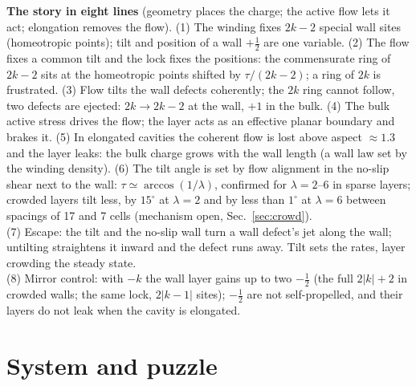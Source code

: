 \documentclass[11pt,a4paper]{article}
\newcommand{\half}{\tfrac12}
\newcommand{\keybox}[1]{\par\smallskip\noindent\colorbox{black!6}{\parbox{\dimexpr\linewidth-2\fboxsep}{\small #1}}\par\smallskip}
\begin{document}
\keybox{\textbf{The story in eight lines} (geometry places the charge; the active flow lets it act; elongation removes the flow).
(1) The winding fixes $2k-2$ special wall sites (homeotropic points); tilt and position of a wall $+\half$ are one variable.
(2) The flow fixes a common tilt and the lock fixes the positions: the commensurate ring of $2k-2$ sits at the homeotropic points shifted by $\tau/(2k-2)$; a ring of $2k$ is frustrated.
(3) Flow tilts the wall defects coherently; the $2k$ ring cannot follow, two defects are ejected: $2k\to2k-2$ at the wall, $+1$ in the bulk.
(4) The bulk active stress drives the flow; the layer acts as an effective planar boundary and brakes it.
(5) In elongated cavities the coherent flow is lost above aspect $\approx1.3$ and the layer leaks: the bulk charge grows with the wall length (a wall law set by the winding density).
(6) The tilt angle is set by flow alignment in the no-slip shear next to the wall: $\tau\simeq\arccos(1/\lambda)$, confirmed for $\lambda=2$--6 in sparse layers; crowded layers tilt less, by $15^\circ$ at $\lambda=2$ and by less than $1^\circ$ at $\lambda=6$ between spacings of 17 and 7 cells (mechanism open, Sec.~\ref{sec:crowd}).\\
(7) Escape: the tilt and the no-slip wall turn a wall defect's jet along the wall; untilting straightens it inward and the defect runs away. Tilt sets the rates, layer crowding the steady state.\\
(8) Mirror control: with $-k$ the wall layer gains up to two $-\half$ (the full $2|k|+2$ in crowded walls; the same lock, $2|k-1|$ sites); $-\half$ are not self-propelled, and their layers do not leak when the cavity is elongated.}

\tableofcontents
\bigskip

\section{System and puzzle}
\end{document}
